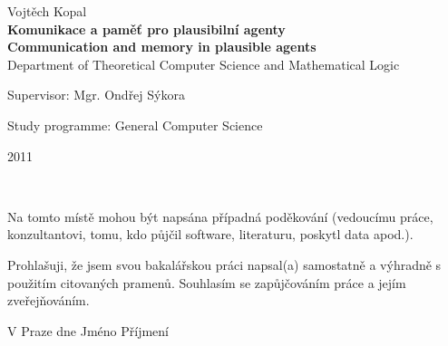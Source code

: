 \documentclass[12pt,notitlepage]{report}
\begin{document}
\begin{titlepage}
\begin{center}
\vspace{15mm}

{\Large Vojtěch Kopal}\\ %
\vspace{5mm}
{\Large\bf Komunikace a paměť pro plausibilní agenty}\\ %
\vspace{3mm}
{\Large\bf Communication and memory in plausible agents}\\ %
\vspace{5mm}
{\Large Department of Theoretical Computer Science and Mathematical Logic}\\
\end{center}
\vspace{10mm}

\large
\noindent Supervisor: Mgr. Ondřej Sýkora
\vspace{1mm} 

\noindent Study programme: General Computer Science

\vspace{20mm}

\begin{center}
2011
\end{center}

\end{titlepage} %

\normalsize %
\setcounter{page}{2} %
\ \vspace{10mm} 

\noindent Na tomto místě mohou být napsána případná poděkování (vedoucímu práce, konzultantovi, tomu, kdo půjčil software, literaturu, poskytl data apod.). %

\vspace{\fill} %
\noindent Prohlašuji, že jsem svou bakalářskou práci napsal(a) samostatně a výhradně s použitím citovaných pramenů. Souhlasím se zapůjčováním práce a jejím zveřejňováním.

\bigskip
\noindent V Praze dne \hspace{\fill}Jméno Příjmení\\ %

\end{document}
